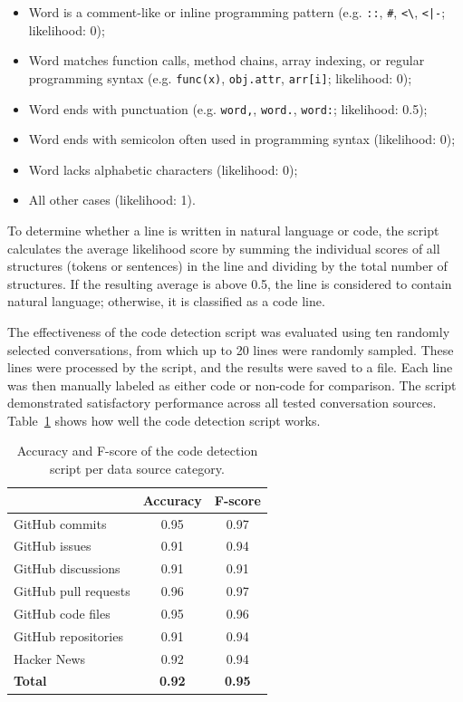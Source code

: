 \begin{itemize}
\begin{itemize}
        \item Word is a comment-like or inline programming pattern (e.g. \texttt{::}, \texttt{\#}, \texttt{<\textbackslash }, \texttt{<|-};  likelihood: 0);
        \item Word matches function calls, method chains, array indexing, or regular programming syntax (e.g. \texttt{func(x)}, \texttt{obj.attr}, \texttt{arr[i]}; likelihood: 0);
        \item Word ends with punctuation (e.g. \texttt{word,}, \texttt{word.}, \texttt{word:}; likelihood: 0.5);
        \item Word ends with semicolon often used in programming syntax (likelihood: 0);
        \item Word lacks alphabetic characters (likelihood: 0);
        \item All other cases (likelihood: 1).
    \end{itemize}
\end{itemize}

To determine whether a line is written in natural language or code, the script calculates the average likelihood score by summing the individual scores of all structures (tokens or sentences) in the line and dividing by the total number of structures. If the resulting average is above 0.5, the line is considered to contain natural language; otherwise, it is classified as a code line.

The effectiveness of the code detection script was evaluated using ten randomly selected conversations, from which up to 20 lines were randomly sampled. These lines were processed by the script, and the results were saved to a file. Each line was then manually labeled as either code or non-code for comparison. The script demonstrated satisfactory performance across all tested conversation sources. Table~\ref{table:script-accuracy} shows how well the code detection script works.

\begin{table}[h]
    \centering
    \begin{tabular}{|l|c|c|}
        \hline
        & Accuracy & F-score  \\
        \hline
        GitHub commits & 0.95 & 0.97 \\
        \hline
        GitHub issues & 0.91 & 0.94 \\
        \hline
        GitHub discussions & 0.91 & 0.91 \\
        \hline
        GitHub pull requests & 0.96 & 0.97  \\
        \hline
        GitHub code files & 0.95 & 0.96  \\
        \hline
        GitHub repositories & 0.91 & 0.94  \\
        \hline
        Hacker News & 0.92 & 0.94  \\
        \hline
        \textbf{Total} & \textbf{0.92} & \textbf{0.95}  \\
        \hline
    \end{tabular}
    \caption{Accuracy and F-score of the code detection script per data source category.}
    \label{table:script-accuracy}
\end{table}

